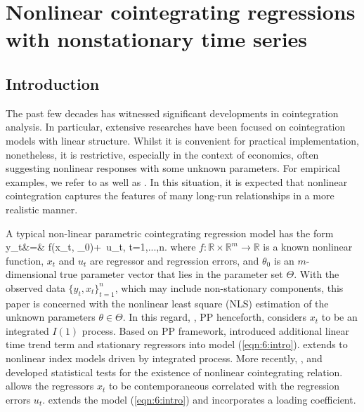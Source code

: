 
\chapter{Nonlinear cointegrating regressions with nonstationary time series}
\ifpdf
    \graphicspath{{Chapter6/Chapter6Figs/PNG/}{Chapter6/Chapter6Figs/PDF/}{Chapter6/Chapter6Figs/}}
\else
    \graphicspath{{Chapter6/Chapter6Figs/EPS/}{Chapter6/Chapter6Figs/}}
\fi

\section{Introduction}
The past few decades has witnessed significant developments in cointegration analysis.
 In particular, extensive researches  have been focused on cointegration models with linear structure. Whilst it is convenient for practical implementation, nonetheless, it is restrictive, especially in the context of economics, often suggesting nonlinear responses with some unknown parameters. For empirical examples, we refer to   \cite{grangerterasvirta1993} as well as \cite{terasvirtatjostheimgranger2010}. In this situation, it is expected that nonlinear cointegration captures the features of many long-run relationships
in a more realistic manner.

A typical non-linear parametric cointegrating regression model has the form
\be
  y_t&=& f(x_t, \theta_0)+\,  u_t, \quad t=1,...,n.
\ee
where  $f:\mathbb{R} \times \mathbb{R}^m \rightarrow \mathbb{R}$ is a known nonlinear function, $x_t$ and  $u_t$ are regressor and regression errors, and   $\theta_0$ is an $m$-dimensional true parameter vector that lies in the parameter set $\Theta$. With the observed data $\{y_t, x_t\}_{t=1}^n$, which may include non-stationary components, this paper is concerned with the nonlinear least square (NLS) estimation of the unknown parameters $\theta\in \Theta$. In this regard, \cite[][\citeyear{parkphillips2001}]{parkphillips1999}, PP henceforth, considers $x_t$ to be an integrated $I(1)$ process. Based on PP framework, \cite{changparkphillips2001} introduced additional linear time trend term and stationary regressors into model (\ref{eqn:6:intro}). \cite{changpark2003} extends to nonlinear index models driven by integrated process.  More recently, \cite{choisaikkonen2010}, \cite{gaokinglutjostheim2009} and \cite{wangphillips2012} developed statistical tests  for the existence of nonlinear cointegrating relation. \cite{changpark2010} allows the regressors $x_t$ to be contemporaneous correlated with the regression errors $u_t$. \cite{shiphillips2010} extends the model (\ref{eqn:6:intro}) and incorporates a loading coefficient.


